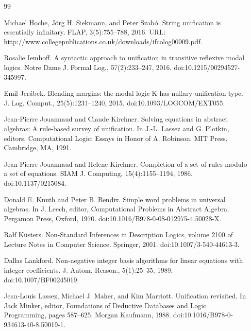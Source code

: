 \documentclass[10pt,a4paper]{amsart}
\begin{document}
\begin{thebibliography}{99}
\par\noindent  [33]  Michael Hoche, Jörg H. Siekmann, and Peter Szabó.  String unification is essentially infinitary.  FLAP, 3(5):755–788, 2016.  URL: http://www.collegepublications.co.uk/downloads/ifcolog00009.pdf.  
 
\par\noindent  [34]  Rosalie Iemhoff.  A syntactic approach to unification in transitive reflexive modal logics.  Notre Dame J. Formal Log., 57(2):233–247, 2016.  doi:10.1215/00294527-345997.  
 
\par\noindent  [35]  Emil Jerábek.  Blending margins: the modal logic K has nullary unification type.  J. Log. Comput., 25(5):1231–1240, 2015.  doi:10.1093/LOGCOM/EXT055.  
 
\par\noindent  [36]  Jean-Pierre Jouannaud and Claude Kirchner.  Solving equations in abstract algebras: A rule-based survey of unification.  In J.-L. Lassez and G. Plotkin, editors, Computational Logic: Essays in Honor of A. Robinson. MIT Press, Cambridge, MA, 1991.  
 
\par\noindent  [37]  Jean-Pierre Jouannaud and Helene Kirchner.  Completion of a set of rules modulo a set of equations.  SIAM J. Computing, 15(4):1155–1194, 1986.  doi:10.1137/0215084.  
 
\par\noindent  [38]  Donald E. Knuth and Peter B. Bendix.  Simple word problems in universal algebras.  In J. Leech, editor, Computational Problems in Abstract Algebra. Pergamon Press, Oxford, 1970.  doi:10.1016/B978-0-08-012975-4.50028-X.  
 
\par\noindent  [39]  Ralf Küsters.  Non-Standard Inferences in Description Logics, volume 2100 of Lecture Notes in Computer Science.  Springer, 2001.  doi:10.1007/3-540-44613-3.  
 
\par\noindent  [40]  Dallas Lankford.  Non-negative integer basis algorithms for linear equations with integer coefficients.  J. Autom. Reason., 5(1):25–35, 1989.  doi:10.1007/BF00245019.  
 
\par\noindent  [41]  Jean-Louis Lassez, Michael J. Maher, and Kim Marriott.  Unification revisited.  In Jack Minker, editor, Foundations of Deductive Databases and Logic Programming, pages 587–625. Morgan Kaufmann, 1988.  doi:10.1016/B978-0-934613-40-8.50019-1.  
 

\end{thebibliography}
\end{document}
